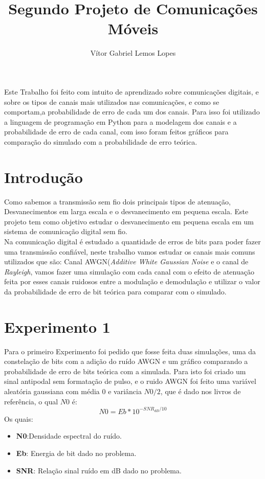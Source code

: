 \documentclass[12pt]{article}
\title{Segundo Projeto de Comunicações Móveis}
\author{Vítor Gabriel Lemos Lopes}
\begin{document}
 

\maketitle

     
\begin{resumo} 
  Este Trabalho foi feito com intuito de aprendizado sobre comunicações digitais, e sobre os tipos de canais mais utilizados nas comunicações, e como se comportam,a probabilidade de erro de cada um dos canais. Para isso foi utilizado a linguagem de programação em Python para a modelagem dos canais e a probabilidade de erro de cada canal, com isso foram feitos gráficos para comparação do simulado com a probabilidade de erro teórica.
\end{resumo}
\section{Introdução}
 Como sabemos a transmissão sem fio dois principais tipos de atenuação, Desvanecimentos em larga escala e o desvanecimento em pequena escala. Este projeto tem como objetivo estudar o desvanecimento em pequena escala em um sistema de comunicação digital sem fio. \\
 Na comunicação digital é estudado a quantidade de erros de bits para poder fazer uma transmissão confiável, neste trabalho vamos estudar os canais mais comuns utilizados que são: Canal AWGN(\textit{Additive White Gaussian Noise} e o canal de \textit{Rayleigh}, vamos fazer uma simulação com cada canal com o efeito de atenuação feita por esses canais ruidosos entre a modulação e demodulação e utilizar o valor da probabilidade de erro de bit teórica para comparar com o simulado.
 

\section{Experimento 1} \label{sec:firstpage}
Para o primeiro Experimento foi pedido que fosse feita duas simulações, uma da constelação de bits com a adição do ruído AWGN e um gráfico comparando a probabilidade de erro de bits teórica com a simulada. Para isto foi criado um sinal antipodal sem formatação de pulso, e o ruido AWGN foi feito uma variável aleatória gaussiana com média 0 e variância $N0/2$, que é dado nos livros de referência, o qual $N0$ é:
\begin{equation}
    N0= Eb * 10^{-SNR_{dB}/10}
\end{equation}
Os quais:
\begin{itemize}
    \item \textbf{N0}:Densidade espectral do ruído.
    \item \textbf{Eb}: Energia de bit dado no problema.
    \item \textbf{SNR}: Relação sinal ruído em dB dado no problema.
\end{itemize}
\end{document}
